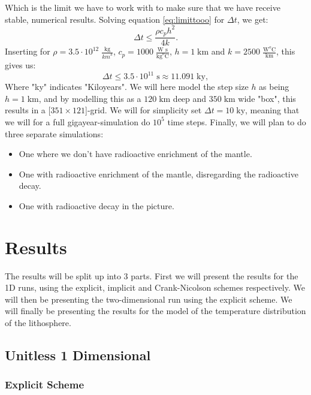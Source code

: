 \documentclass[reprint,english,notitlepage]{revtex4-1}  %
\begin{document}
Which is the limit we have to work with to make sure that we have receive stable, numerical results. Solving equation \ref{eq:limittooo} for $\Delta t$, we get:
\begin{equation}
    \Delta t \leq \frac{\rho c_p h^2}{4k}.
\end{equation}
Inserting for $\rho = 3.5\cdot10^{12} \; \frac{\text{kg}}{{km}^3}$, $c_p = 1000\;\frac{\text{W s}}{\text{kg} ^o \text{C}}$, $h = 1\;\text{km}$ and $k = 2500\;\frac{\text{W}^o\text{C}}{\text{km}}$, this gives us:
\begin{equation}
    \Delta t \leq 3.5\cdot10^{11}\;\text{s} \approx 11.091\;\text{ky}, 
\end{equation}
Where "ky" indicates "Kiloyears". We will here model the step size $h$ as being $h = 1\;\text{km}$, and by modelling this as a $120\;\text{km}$ deep and $350\;\text{km}$ wide "box", this results in a [$351\times121$]-grid. We will for simplicity set $\Delta t = 10\;\text{ky}$, meaning that we will for a full gigayear-simulation do $10^5$ time steps. Finally, we will plan to do three separate simulations:
\begin{itemize}
    \item One where we don't have radioactive enrichment of the mantle.
    \item One with radioactive enrichment of the mantle, disregarding the radioactive decay.
    \item One with radioactive decay in the picture.
\end{itemize}

\newpage

\section{Results}

The results will be split up into 3 parts. First we will present the results for the 1D runs, using the explicit, implicit and Crank-Nicolson schemes respectively. We will then be presenting the two-dimensional run using the explicit scheme. We will finally be presenting the results for the model of the temperature distribution of the lithosphere.

\subsection{Unitless 1 Dimensional}

\subsubsection{Explicit Scheme}
\end{document}
